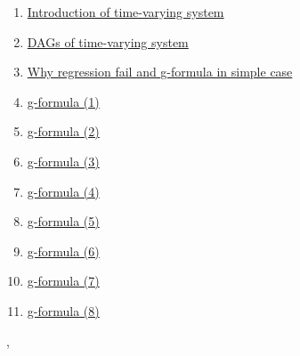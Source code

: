 \documentclass[11pt]{article}
\renewcommand{\today}{\shortmonthname[\the\month] \the \day,  \the\year}
\begin{document}
\begin{enumerate}
	\item \href{https://mp.weixin.qq.com/s/RmfZv7W4_e6vWohTkAYGjg}{Introduction of time-varying system}	%
	\item \href{https://mp.weixin.qq.com/s/YJnn2hG_jsK-7BxGfgobTQ}{DAGs of time-varying system}	%
	\item \href{https://mp.weixin.qq.com/s/W7W-MO-VCpU92tYF73aqRQ}{Why regression fail and g-formula in simple case}	%
	\item \href{https://mp.weixin.qq.com/s/B3rAP8NRpz60hfU1PpgJ4A}{g-formula (1)}	%
	\item \href{https://mp.weixin.qq.com/s/1UlKBo28nTVETec53cIn3Q}{g-formula (2)}	%
	\item \href{https://mp.weixin.qq.com/s/nuRefZw7A7BsL10giGz__w}{g-formula (3)}	%
	\item \href{https://mp.weixin.qq.com/s/mJsF27jYbdXUu9gAlkhIFw}{g-formula (4)}	%
	\item \href{https://mp.weixin.qq.com/s/oe3ygsTkzY3s9sw3CgVDXw}{g-formula (5)}	%
	\item \href{https://mp.weixin.qq.com/s/GOce-aNrvnZz-zpeZJxTrg}{g-formula (6)}	%
	\item \href{https://mp.weixin.qq.com/s/ne_rbSLWPXV5hoGrySikrw}{g-formula (7)}	%
	\item \href{https://mp.weixin.qq.com/s/FUYsX3IZQLBjW-7yoI35Lw}{g-formula (8)}	%
\end{enumerate}




%
\begin{flushright}
	\tiny \today 
\end{flushright}
\end{document}
